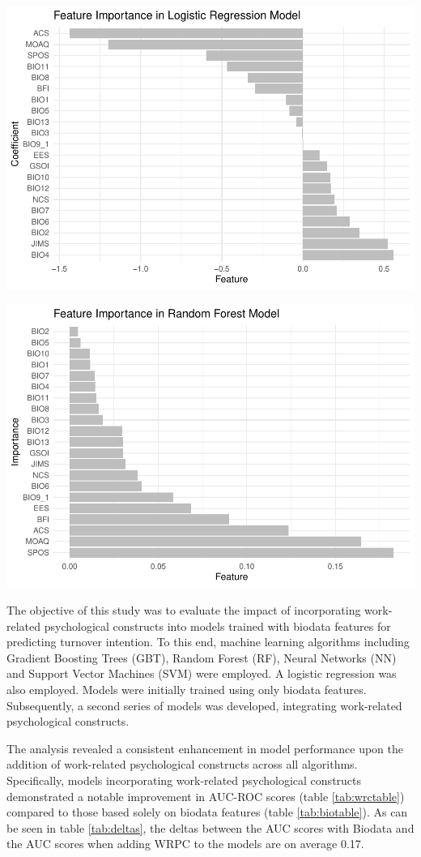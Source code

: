 \documentclass[
  man]{apa7}
\begin{document}
\includegraphics{dissertation_files/figure-latex/coefbg-1.pdf}

\includegraphics{dissertation_files/figure-latex/featuresbg-1.pdf}

The objective of this study was to evaluate the impact of incorporating work-related psychological constructs into models trained with biodata features for predicting turnover intention. To this end, machine learning algorithms including Gradient Boosting Trees (GBT), Random Forest (RF), Neural Networks (NN) and Support Vector Machines (SVM) were employed. A logistic regression was also employed. Models were initially trained using only biodata features. Subsequently, a second series of models was developed, integrating work-related psychological constructs.

The analysis revealed a consistent enhancement in model performance upon the addition of work-related psychological constructs across all algorithms. Specifically, models incorporating work-related psychological constructs demonstrated a notable improvement in AUC-ROC scores (table \ref{tab:wrctable}) compared to those based solely on biodata features (table \ref{tab:biotable}). As can be seen in table \ref{tab:deltas}, the deltas between the AUC scores with Biodata and the AUC scores when adding WRPC to the models are on average 0.17.
\end{document}
